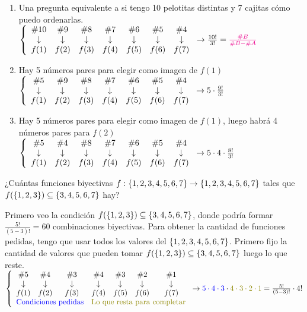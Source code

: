 \documentclass[12pt,a4paper, spanish]{article}
\begin{document}
\begin{enumerate}[label=\roman*)]
	\item Una pregunta equivalente a si tengo 10 pelotitas distintas y 7 cajitas cómo puedo ordenarlas.
	      $\llave{c c c c c c c}{
			      \#10 & \#9 & \#8 & \#7 & \#6 & \#5 & \#4 \\
			      \downarrow &\downarrow & \downarrow &\downarrow &\downarrow &\downarrow &\downarrow\\
			      f(1) & f(2) &f(3) &f(4) &f(5) &f(6) &f(7)
		      }
		      \to\frac{10!}{3!} = \magenta{$\frac{\#B}{\#B - \#A}$
		      }$

	\item Hay 5 números pares para elegir como imagen de $f(1)$\\
	      $\llave{c c c c c c c}{
			      \#5 & \#9 & \#8 & \#7 & \#6 & \#5 & \#4 \\
			      \downarrow &\downarrow & \downarrow &\downarrow &\downarrow &\downarrow &\downarrow\\
			      f(1) & f(2) &f(3) &f(4) &f(5) &f(6) &f(7)
		      }
		      \to 5 \cdot \frac{9!}{3!}$

	\item Hay 5 números pares para elegir como imagen de $f(1)$, luego habrá 4 números pares para $f(2)$\\
	      $\llave{c c c c c c c}{
			      \#5 & \#4 & \#8 & \#7 & \#6 & \#5 & \#4 \\
			      \downarrow &\downarrow & \downarrow &\downarrow &\downarrow &\downarrow &\downarrow\\
			      f(1) & f(2) &f(3) &f(4) &f(5) &f(6) &f(7)
		      }
		      \to 5 \cdot 4 \cdot \frac{8!}{3!}$
\end{enumerate}

\ejercicio
¿Cuántas funciones biyectivas $f: \set{1,2,3,4,5,6,7} \to \set{1,2,3,4,5,6,7}$ tales que $f(\set{1,2,3}) \subseteq \set{3,4,5,6,7}$ hay?

\separadorCorto

Primero veo la condición  $f(\set{1,2,3}) \subseteq \set{3,4,5,6,7}$, donde podría formar $\frac{5!}{(5-3)!} = 60$ combinaciones biyectivas.
Para obtener la cantidad de funciones pedidas, tengo que usar todos los valores del $\set{1,2,3,4,5,6,7}$. Primero fijo la cantidad de
valores que pueden tomar $f(\set{1,2,3}) \subseteq \set{3,4,5,6,7}$ luego lo que reste.
\\
$\llave{c c c c c c c}{
		\#5 & \#4 & \#3 & \#4 & \#3 & \#2 & \#1 \\
		\downarrow & \downarrow & \downarrow &\downarrow &\downarrow &\downarrow &\downarrow\\
		f(1) & f(2) &f(3) &f(4) &f(5) &f(6) &f(7)\\
		\multicolumn{3}{c}{\blue{Condiciones pedidas}} & \multicolumn{4}{c}{\green{Lo que resta para completar}}
	}
	\to \blue{$5 \cdot 4 \cdot 3$} \cdot \green{$4 \cdot 3 \cdot 2 \cdot 1$} = \frac{5!}{(5-3)!} \cdot 4!$
\end{document}
